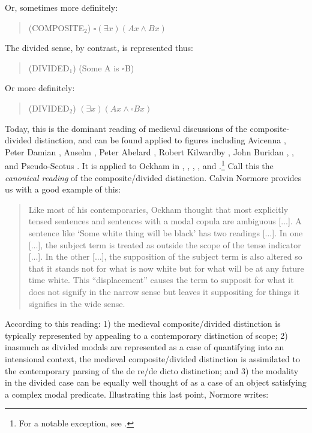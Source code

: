 \documentclass[a4paper]{article}
\begin{document}
\noindent Or, sometimes more definitely:

\begin{quote}
(COMPOSITE$_{2}$) $\square(\exists x)(Ax \wedge Bx)$
\end{quote}

The divided sense, by contrast, is represented thus:

\begin{quote}
(DIVIDED$_{1}$) (Some A is $\square$B)
\end{quote}

\noindent Or more definitely:

\begin{quote}
(DIVIDED$_{2}$) $(\exists x)(Ax \wedge \square Bx)$
\end{quote}

Today, this is the dominant reading of medieval discussions of the composite-divided distinction, and can be found applied to figures including Avicenna \cite{Chatti2015}, Peter Damian \cite{Marenbon2008}, Anselm \cite{Roark2003}, Peter Abelard \cite{Wilks2008}, Robert Kilwardby \cite{Thom2007}, John Buridan \cite{Parsons2008}, \cite{Johnston2015b}, and Pseudo-Scotus \cite{McDermott1972}. It is applied to Ockham in \cite{PriestRead1981}, \cite{Read2007}, \cite[p. 350]{DutilhNovaes2007}, \cite[p. 298]{Parsons2014}, and \cite[pp. 237-238]{Johnston2015}.\footnote{For a notable exception, see \cite[p. 62]{Panaccio1999}.} Call this the \textit{canonical reading} of the composite/divided distinction. Calvin Normore provides us with a good example of this:

\begin{quote}
Like most of his contemporaries, Ockham thought that most explicitly tensed sentences and sentences with a modal copula are ambiguous [...]. A sentence like `Some white thing will be black' has two readings [...]. In one [...], the subject term is treated as outside the scope of the tense indicator [...]. In the other [...], the supposition of the subject term is also altered so that it stands not for what is now white but for what will be at any future time white. This “displacement” causes the term to supposit for what it does not signify in the narrow sense but leaves it suppositing for things it signifies in the wide sense. \cite[pp. 39-40]{Normore1999}
\end{quote}


According to this reading: 1) the medieval composite/divided distinction is typically represented by appealing to a contemporary distinction of scope; 2) inasmuch as divided modals are represented as a case of quantifying into an intensional context, the medieval composite/divided distinction is assimilated to the contemporary parsing of the de re/de dicto distinction;  and 3) the modality in the divided case can be equally well thought of as a case of an object satisfying a complex modal predicate. Illustrating this last point, Normore writes: 
\end{document}
